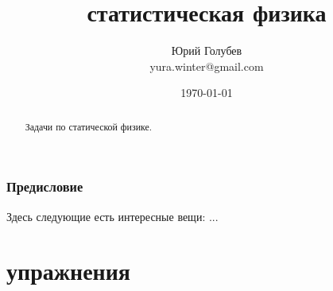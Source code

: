 \documentclass[a4paper,12pt]{article} %
\author{Юрий Голубев\\ yura.winter@gmail.com }
\title{статистическая физика}
\date{\today}
\begin{document}
\maketitle

\begin{abstract}
Задачи по статической физике.
\end{abstract}
\tableofcontents

\section*{Предисловие}

Здесь следующие есть интересные вещи:
...




\clearpage
\part{упражнения}
\end{document}
